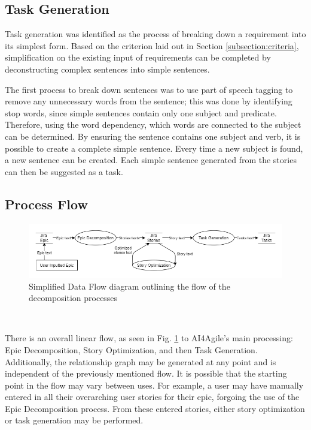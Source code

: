 \subsection{Task Generation}

Task generation was identified as the process of breaking down a requirement into its simplest form. Based on the criterion laid out in Section \ref{subsection:criteria}, simplification on the existing input of requirements can be completed by deconstructing complex sentences into simple sentences. 

The first process to break down sentences was to use part of speech tagging to remove any unnecessary words from the sentence; this was done by identifying stop words, since simple sentences contain only one subject and predicate. Therefore, using the word dependency, which words are connected to the subject can be determined. By ensuring the sentence contains one subject and verb, it is possible to create a complete simple sentence. Every time a new subject is found, a new sentence can be created. Each simple sentence generated from the stories can then be suggested as a task.

\subsection{Process Flow}

\begin{figure}
\centering
\includegraphics[width=\textwidth,keepaspectratio]{./figure/ExampleDataFlowDiagram.png}
\caption{Simplified Data Flow diagram outlining the flow of the decomposition processes}
\label{fig:ExampleDataFlowDiagram}
\end{figure}\

There is an overall linear flow, as seen in Fig. \ref{fig:ExampleDataFlowDiagram} to AI4Agile’s main processing: Epic Decomposition, Story Optimization, and then Task Generation. Additionally, the relationship graph may be generated at any point and is independent of the previously mentioned flow. It is possible that the starting point in the flow may vary between uses. For example, a user may have manually entered in all their overarching user stories for their epic, forgoing the use of the Epic Decomposition process. From these entered stories, either story optimization or task generation may be performed.


